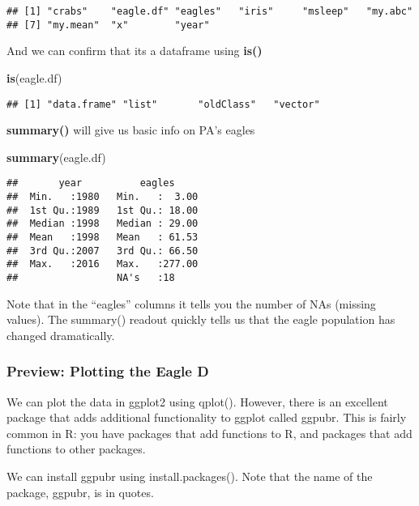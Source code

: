 \documentclass[]{book}
\newenvironment{Shaded}{\begin{snugshade}}{\end{snugshade}}
\newcommand{\KeywordTok}[1]{\textcolor[rgb]{0.13,0.29,0.53}{\textbf{#1}}}
\newcommand{\NormalTok}[1]{#1}
\theoremstyle{definition}
\theoremstyle{definition}
\theoremstyle{definition}
\theoremstyle{remark}
\begin{document}
\begin{verbatim}
## [1] "crabs"    "eagle.df" "eagles"   "iris"     "msleep"   "my.abc"  
## [7] "my.mean"  "x"        "year"
\end{verbatim}

And we can confirm that its a dataframe using \textbf{is()}

\begin{Shaded}
\begin{Highlighting}[]
\KeywordTok{is}\NormalTok{(eagle.df)}
\end{Highlighting}
\end{Shaded}

\begin{verbatim}
## [1] "data.frame" "list"       "oldClass"   "vector"
\end{verbatim}

\textbf{summary()} will give us basic info on PA's eagles

\begin{Shaded}
\begin{Highlighting}[]
\KeywordTok{summary}\NormalTok{(eagle.df)}
\end{Highlighting}
\end{Shaded}

\begin{verbatim}
##       year          eagles      
##  Min.   :1980   Min.   :  3.00  
##  1st Qu.:1989   1st Qu.: 18.00  
##  Median :1998   Median : 29.00  
##  Mean   :1998   Mean   : 61.53  
##  3rd Qu.:2007   3rd Qu.: 66.50  
##  Max.   :2016   Max.   :277.00  
##                 NA's   :18
\end{verbatim}

Note that in the ``eagles'' columns it tells you the number of NAs
(missing values). The summary() readout quickly tells us that the eagle
population has changed dramatically.

\subsubsection{Preview: Plotting the Eagle
D}\label{preview-plotting-the-eagle-d}

We can plot the data in ggplot2 using qplot(). However, there is an
excellent package that adds additional functionality to ggplot called
ggpubr. This is fairly common in R: you have packages that add functions
to R, and packages that add functions to other packages.

We can install ggpubr using install.packages(). Note that the name of
the package, ggpubr, is in quotes.
\end{document}
